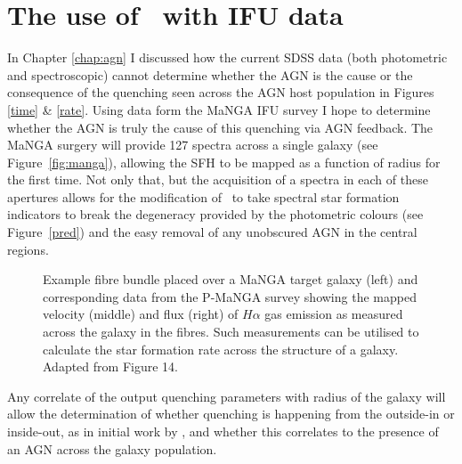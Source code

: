 \section{The use of \starpy\ with IFU data}\label{sec:IFU}

In Chapter \ref{chap:agn} I discussed how the current SDSS data (both photometric and spectroscopic) cannot determine whether the AGN is the cause or the consequence of the quenching seen across the AGN host population in Figures \ref{time} \& \ref{rate}. Using data form the MaNGA \citep{bundy15} IFU survey I hope to determine whether the AGN is truly the cause of this quenching via AGN feedback. The MaNGA surgery will provide 127 spectra across a single galaxy (see Figure~\ref{fig:manga}), allowing the SFH to be mapped as a function of radius for the first time. Not only that, but the acquisition of a spectra in each of these apertures allows for the modification of \starpy\ to take spectral star formation indicators \citep[such as $H\alpha$][]{ref} to break the degeneracy provided by the photometric colours (see Figure~\ref{pred}) and the easy removal of any unobscured AGN in the central regions. 

\begin{figure}
\caption[Example MaNGA fibre bundle on a target galaxy with example emission data]{Example fibre bundle placed over a MaNGA target galaxy (left) and corresponding data from the P-MaNGA survey showing the mapped velocity (middle) and flux (right) of $H\alpha$ gas emission as measured across the galaxy in the fibres. Such measurements can be utilised to calculate the star formation rate across the structure of a galaxy. Adapted from \cite{bundy15} Figure 14.}
\label{gal}
\end{figure}

Any correlate of the output quenching parameters with radius of the galaxy will allow the determination of whether quenching is happening from the outside-in \citep[i.e. due to the environment, as in][]{ref, ref} or inside-out, as in initial work by \citet{ref}, and whether this correlates to the presence of an AGN across the galaxy population.


